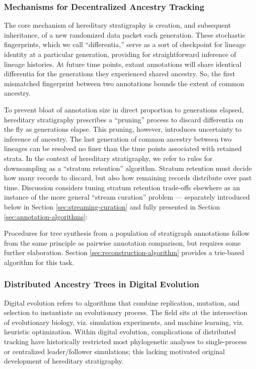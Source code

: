 \subsubsection{Mechanisms for Decentralized Ancestry Tracking}

The core mechanism of hereditary stratigraphy is creation, and subsequent inheritance, of a new randomized data packet each generation.
These stochastic fingerprints, which we call ``differentia,'' serve as a sort of checkpoint for lineage identity at a particular generation, providing for straightforward inference of lineage histories.
At future time points, extant annotations will share identical differentia for the generations they experienced shared ancestry.
So, the first mismatched fingerprint between two annotations bounds the extent of common ancestry.

To prevent bloat of annotation size in direct proportion to generations elapsed, hereditary stratigraphy prescribes a ``pruning'' process to discard   differentia on the fly as generations elapse.
This pruning, however, introduces uncertainty to inference of ancestry.
The last generation of common ancestry between two lineages can be resolved no finer than the time points associated with retained strata.
In the context of hereditary stratigraphy, we refer to rules for downsampling as a ``stratum retention'' algorithm.
Stratum retention must decide how many records to discard, but also how remaining records distribute over past time.
Discussion considers tuning stratum retention trade-offs elsewhere as an instance of the more general ``stream curation'' problem --- separately    introduced below in Section \ref{sec:streaming-curation} and fully presented in Section \ref{sec:annotation-algorithms}:

Procedures for tree synthesis from a population of stratigraph annotations follow from the same principle as pairwise annotation comparison, but requires some further elaboration.
Section \ref{sec:reconstruction-algorithm} provides a trie-based algorithm for this task.

\subsubsection{Distributed Ancestry Trees in Digital Evolution}

Digital evolution refers to algorithms that combine replication, mutation, and selection to instantiate an evolutionary process.
The field sits at the intersection of evolutionary biology, viz. simulation experiments, and machine learning, viz. heuristic optimization.
Within digital evolution, complications of distributed tracking have historically restricted most phylogenetic analyses to single-process or centralized leader/follower simulations; this lacking motivated original development of hereditary stratigraphy.


